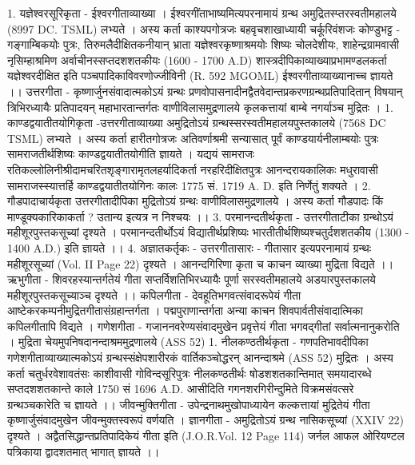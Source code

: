 1. यज्ञेश्वरसूरिकृता - ईश्वरगीताव्याख्या ।
ईश्वरगींताभाष्यमित्यपरनामायं ग्रन्थ अमुद्रितस्प्तरस्वतीमहालये (8997 DC. TSML) लभ्यते । अस्य कर्ता काश्यपगोत्रजः बहवृचशाखाध्यायी चर्कूरिवंशजः कोण्डुभट्ट - गङ्गाम्बिकयोः पुत्रः, तिरुमलैदीक्षितकनीयान् भ्राता यज्ञेश्वरकृष्णाश्रमयोः शिष्यः चोलदेशीयः, शाहेन्द्रग्रामवासी नृसिम्हाश्रमिण अर्वाचीनस्सप्तदशशतकीयः (1600 - 1700 A.D) शास्त्रदीपिकाव्याख्याप्रभामण्डलकर्ता यज्ञेश्वरदीक्षित इति पञ्चपादिकाविवरणोज्जीविनी (R. 592 MGOML) ईश्वरगीताव्याख्यानाच्च ज्ञायते ।। 
उत्तरगीता - 
कृष्णार्जुनसंवादात्मकोऽयं ग्रन्थः प्रणवोपासनादीनद्वैतवेदान्तप्रकरणग्रन्थप्रतिपादितान् विषयान् त्रिभिरध्यायैः प्रतिपादयन् महाभारतान्तर्गतः वाणीविलासमुद्रणालये कृलकत्तायां बाम्बे नगर्याञ्च मुद्रितः । 
1. काण्डद्वयातीतयोगिकृता -उत्तरगीताव्याख्या 
अमुद्रितोऽयं ग्रन्थस्सरस्वतीमहालयपुस्तकालये (7568 DC TSML) लभ्यते । अस्य कर्ता हारीतगोत्रजः अतिवर्णाश्रमी सन्यासात् पूर्वं काण्डयार्यनीलाम्बयोः पुत्रः सामराजतीर्थशिष्यः काण्डद्वयातीतयोगीति ज्ञायते । यद्ययं सामराजः रतिकल्लोलिनीश्रीदामचरितशृङ्गारामृतलहर्यादिकर्ता नरहरिदीक्षितपुत्रः आनन्दरायकालिकः मधुरावासी सामराजस्स्यात्तर्हि काण्डद्वयातीतयोगिनः कालः 1775 सं. 1719 A. D.  इति निर्णेतुं शक्यते । 
2. गौडपादाचार्यकृता उत्तरगीतादीपिका 
मुद्रितोऽयं ग्रन्थः वाणीविलासमुद्रणालये । अस्य कर्ता गौडपादः किं माण्डूक्यकारिकाकर्ता ? उतान्य इत्यत्र न निश्चयः ।। 
3. परमानन्दतीर्थकृता - उत्तरगीताटीका 
ग्रन्थोऽयं महीशूरपुस्तकसूच्यां दृश्यते । परमानन्दतीर्थोऽयं विद्यातीर्थप्रशिष्यः भारतीतीर्थशिष्यश्चतुर्दशशतकीय (1300 - 1400 A.D.) इति ज्ञायते ।। 
4. अज्ञातकर्तृकः - उत्तरगीतासारः - 
गीतासार इत्यपरनामायं ग्रन्थः महीशूरसूच्यां (Vol. II Page 22) दृश्यते । आनन्दगिरिणा कृता च काचन व्याख्या मुद्रिता विद्यते ।। 
ऋभुगीता - 
शिवरहस्यान्तर्गतेयं गीता सप्तर्विशतिभिरध्यायैः पूर्णा सरस्वतीमहालये अडयारपुस्तकालये महीशूरपुस्तकसूच्याञ्च दृश्यते ।।
कपिलगीता - 
देवहूतिभगवत्संवादरूपेयं गीता आष्टेकरकम्पनीमुद्रितगीतासंग्रहान्तर्गता । पद्मपुराणान्तर्गता अन्या काचन शिवपार्वतीसंवादात्मिका कपिलगीतापि विद्यते । 
गणेशगीता - 
गजाननवरेण्यसंवादमुखेन प्रवृत्तेयं गीता भगवद्गीतां सर्वात्मनानुकरोति । मुद्रिता चेयमुपनिषदानन्दाश्रममुद्रणालये (ASS 52)
1.  नीलकण्ठतीर्थकृता - गणपतिभावदीपिका 
गणेशगीताव्याख्यात्मकोऽयं ग्रन्थस्संक्षेपशारीरकं वार्तिकञ्चोद्धरन् आनन्दाश्रमे (ASS 52) मुद्रितः । अस्य कर्ता चतुर्धरवेशावतंसः काशीवासी गोविन्दसूरिपुत्रः नीलकण्ठतीर्थः षोडशशतकान्तिमात्  समयादारब्धे सप्तदशशतकान्ते काले 1750 सं 1696 A.D. आसीदिति गगनशरगिरीन्दुमिते विक्रमसंवत्सरे ग्रन्थञ्चकारेति च ज्ञायते ।। 
जीवन्मुक्तिगीता - 
उपेन्द्रनाथमुखोपाध्यायेन कल्कत्तायां मुद्रितेयं गीता कृष्णार्जुसंवादमुखेन जीवन्मुक्तस्वरूपं वर्णयति । 
ज्ञानगीता -
अमुद्रितोऽयं ग्रन्थ नासिकसूच्यां (XXIV 22) दृश्यते । अद्वैतसिद्धान्तप्रतिपादिकेयं गीता इति (J.O.R.Vol. 12 Page 114) जर्नल आफल ओरियण्टल पत्रिकाया द्वादशतमात् भागात् ज्ञायते ।।
